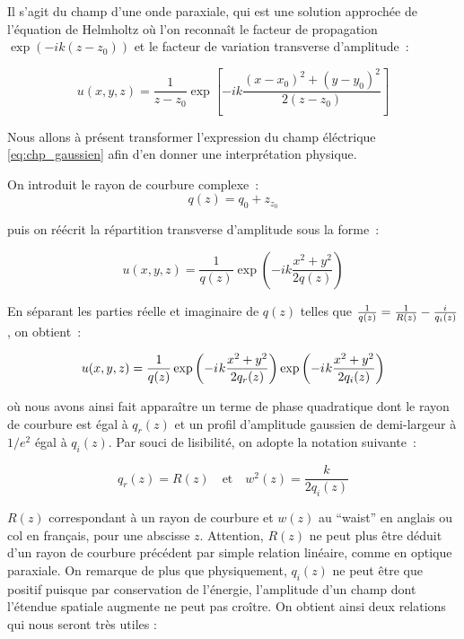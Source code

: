 \documentclass[a4paper]{book}
\newcommand{\iu}{{i\mkern1mu}}
\begin{document}

Il s'agit du champ d'une onde paraxiale, qui est une solution approchée de l'équation de Helmholtz où l'on reconnaît le facteur de propagation $\exp(-ik(z-z_0))$ et le facteur de variation transverse d'amplitude~:

\begin{equation}
    u(x, y, z) = \frac{1}{z-z_0}\exp\left[-ik\frac{(x-x_0)^2+(y-y_0)^2}{2(z-z_0)}\right]
\end{equation}

Nous allons à présent transformer l'expression du champ éléctrique \ref{eq:chp_gaussien} afin d'en donner une interprétation physique. 

On introduit le rayon de courbure complexe~: 
\begin{equation}
    q(z)=q_0+z_{z_{0}}
\end{equation}

puis on réécrit la répartition transverse d'amplitude sous la forme~: 

\begin{equation}
    u(x, y, z) = \frac{1}{q(z)}\exp\left(-ik\frac{x^2+y^2}{2q(z)}\right)
\end{equation}

En séparant les parties réelle et imaginaire de $q(z)$ telles que $\frac{1}{q(z)}=\frac{1}{R(z)}-\frac{\iu}{q_i(z)}$, on obtient~:

\begin{equation}
    u(x,y,z)=\frac{1}{q(z)}\exp\left(-\iu k \frac{x^2 + y^2}{2q_r(z)}\right)\exp\left(-\iu k \frac{x^2 + y^2}{2q_i(z)}\right)
\end{equation}

où nous avons ainsi fait apparaître un terme de phase quadratique dont le rayon de courbure est égal à $q_r(z)$ et un profil d'amplitude gaussien de demi-largeur à $1/e^2$ égal à $q_i(z)$. Par souci de lisibilité, on adopte la notation suivante~:

\begin{equation}
    q_r(z)=R(z)\quad\mathrm{et}\quad w^2(z)=\frac{k}{2q_i(z)}
\end{equation}

$R(z)$ correspondant à un rayon de courbure et $w(z)$ au ``waist'' en anglais ou col en français, pour une abscisse $z$. Attention, $R(z)$ ne peut plus être déduit d'un rayon de courbure précédent par simple relation linéaire, comme en optique paraxiale. On remarque de plus que physiquement, $q_i(z)$ ne peut être que positif puisque par conservation de l'énergie, l'amplitude d'un champ dont l'étendue spatiale augmente ne peut pas croître. 
On obtient ainsi deux relations qui nous seront très utiles :
\end{document}
